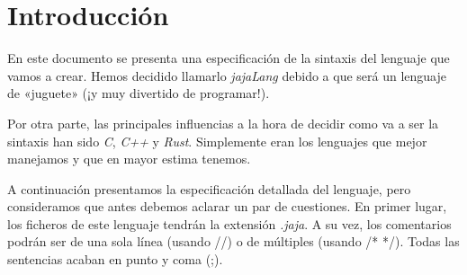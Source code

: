 \chapter*{Introducción}
En este documento se presenta una especificación de la sintaxis del lenguaje que
vamos a crear. Hemos decidido llamarlo \textit{jajaLang} debido a que será un
lenguaje de «juguete» (¡y muy divertido de programar!).

Por otra parte, las principales influencias a la hora de decidir como va a ser
la sintaxis han sido \textit{C}, \textit{C++} y \textit{Rust}. Simplemente eran
los lenguajes que mejor manejamos y que en mayor estima tenemos.

A continuación presentamos la especificación detallada del lenguaje, pero
consideramos que antes debemos aclarar un par de cuestiones. En primer lugar,
los ficheros de este lenguaje tendrán la extensión \textit{.jaja}. A su vez, los
comentarios podrán ser de una sola línea (usando //) o de múltiples (usando /*
*/). Todas las sentencias acaban en punto y coma (;).
